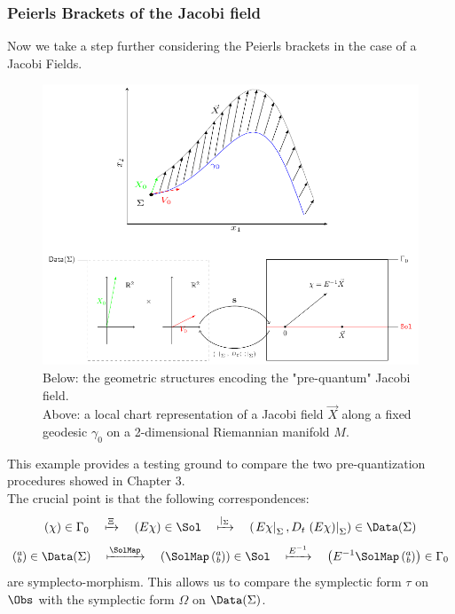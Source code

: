 \documentclass[Main]{subfiles}
\begin{document}
		\subsubsection{Peierls Brackets of the Jacobi field}
		Now we take a step further considering the Peierls brackets in the case of a Jacobi Fields.
		\begin{figure}[h!]
			\includegraphics[width=\textwidth]{Pictures/Jacobi_GeometricPicturePanoramica}	
			\caption{ 
			Below: the geometric structures encoding the "pre-quantum" Jacobi field.
			\\
			Above: a local chart representation of a Jacobi field $\vec{X}$ along a fixed geodesic $\gamma_0$ on a  2-dimensional Riemannian manifold $M$.
			}	
		\end{figure}				

		This example provides a testing ground to compare the two pre-quantization procedures showed in Chapter 3.\\
		The crucial point is that the following correspondences:
		\begin{displaymath}
			(\chi) \in \Gamma_0 \quad \xmapsto{\Xi} \quad (E \chi) \in \Sol \quad \xmapsto{\vert_\Sigma} \quad 
			 \left(\left. E\chi \right\vert_\Sigma , D_t\left.\left( E \chi \right)\right\vert_\Sigma \right) \in\Data(\Sigma)
		\end{displaymath}
		\begin{displaymath}
			 \left(\substack{a\\b}\right) \in\Data(\Sigma) \quad \xmapsto{\SolMap} \quad
			 \left( \SolMap \left(\substack{a\\b}\right) \right)\in \Sol \quad \xmapsto{E^{-1}} \quad 
			 \left( E^{-1}\SolMap \left(\substack{a\\b}\right) \right) \in \Gamma_0
		\end{displaymath}
		are symplecto-morphism. This allows us to compare the symplectic form $\tau$ on $\Obs$ with the symplectic form $\Omega$ on $\Data(\Sigma)$.
		
\end{document}
